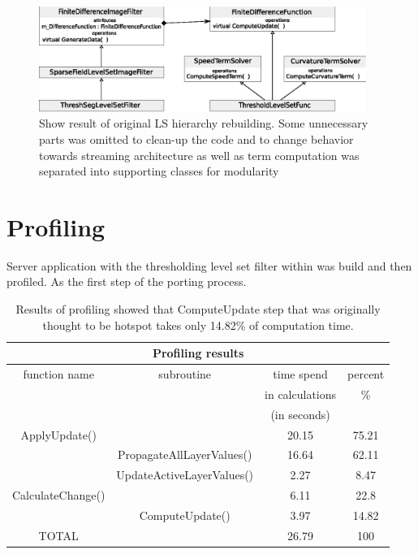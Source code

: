 \begin{figure}
    \centering
    \includegraphics[width=0.95\textwidth]{data/resultingFilter}
    \caption[Resulting level set filter ready to be ported to Cell/B.E.]
    {
Show result of original LS hierarchy rebuilding.
Some unnecessary parts was omitted to clean-up the code and to change behavior towards streaming architecture as well as term computation was separated into supporting classes for modularity
    }
    \label{fg:resultingFilter}
\end{figure}

\section{Profiling}

Server application with the thresholding level set filter within was build and then profiled. As the first step of the porting process.

\begin{table}
\centering
\begin{tabular}{|c|c|c|c|}
\hline
\multicolumn{4}{|c|}{Profiling results}\\
\hline
function name&subroutine&time spend&percent\\&&in calculations&\%\\&&(in seconds)&\\
\hline
\hline
ApplyUpdate()	&				&	20.15&	75.21\\
\hline
		&PropagateAllLayerValues()	&	16.64&	62.11\\
\hline
		&UpdateActiveLayerValues()	&	2.27&	8.47\\
\hline
CalculateChange()&				&	6.11&	22.8\\
\hline
		&ComputeUpdate()		&	3.97&	14.82\\
\hline
TOTAL		&				&	26.79&	100\\
\hline
\end{tabular}
\par
\caption[Profiling results]
{
  Results of profiling showed that ComputeUpdate step that was originally thought to be hotspot takes only 14.82\% of computation time.
}
\label{tab:profilingresults}
\end{table}

